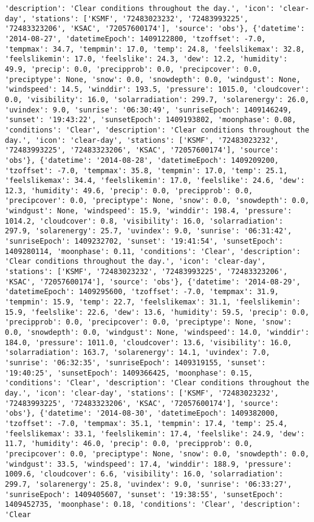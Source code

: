 \documentclass[
  letterpaper,
  DIV=11,
  numbers=noendperiod]{scrartcl}
\begin{document}
\begin{verbatim}
'description': 'Clear conditions throughout the day.', 'icon': 'clear-day', 'stations': ['KSMF', '72483023232', '72483993225', '72483323206', 'KSAC', '72057600174'], 'source': 'obs'}, {'datetime': '2014-08-27', 'datetimeEpoch': 1409122800, 'tzoffset': -7.0, 'tempmax': 34.7, 'tempmin': 17.0, 'temp': 24.8, 'feelslikemax': 32.8, 'feelslikemin': 17.0, 'feelslike': 24.3, 'dew': 12.2, 'humidity': 49.9, 'precip': 0.0, 'precipprob': 0.0, 'precipcover': 0.0, 'preciptype': None, 'snow': 0.0, 'snowdepth': 0.0, 'windgust': None, 'windspeed': 14.5, 'winddir': 193.5, 'pressure': 1015.0, 'cloudcover': 0.0, 'visibility': 16.0, 'solarradiation': 299.7, 'solarenergy': 26.0, 'uvindex': 9.0, 'sunrise': '06:30:49', 'sunriseEpoch': 1409146249, 'sunset': '19:43:22', 'sunsetEpoch': 1409193802, 'moonphase': 0.08, 'conditions': 'Clear', 'description': 'Clear conditions throughout the day.', 'icon': 'clear-day', 'stations': ['KSMF', '72483023232', '72483993225', '72483323206', 'KSAC', '72057600174'], 'source': 'obs'}, {'datetime': '2014-08-28', 'datetimeEpoch': 1409209200, 'tzoffset': -7.0, 'tempmax': 35.8, 'tempmin': 17.0, 'temp': 25.1, 'feelslikemax': 34.4, 'feelslikemin': 17.0, 'feelslike': 24.6, 'dew': 12.3, 'humidity': 49.6, 'precip': 0.0, 'precipprob': 0.0, 'precipcover': 0.0, 'preciptype': None, 'snow': 0.0, 'snowdepth': 0.0, 'windgust': None, 'windspeed': 15.9, 'winddir': 198.4, 'pressure': 1014.2, 'cloudcover': 0.8, 'visibility': 16.0, 'solarradiation': 297.9, 'solarenergy': 25.7, 'uvindex': 9.0, 'sunrise': '06:31:42', 'sunriseEpoch': 1409232702, 'sunset': '19:41:54', 'sunsetEpoch': 1409280114, 'moonphase': 0.11, 'conditions': 'Clear', 'description': 'Clear conditions throughout the day.', 'icon': 'clear-day', 'stations': ['KSMF', '72483023232', '72483993225', '72483323206', 'KSAC', '72057600174'], 'source': 'obs'}, {'datetime': '2014-08-29', 'datetimeEpoch': 1409295600, 'tzoffset': -7.0, 'tempmax': 31.9, 'tempmin': 15.9, 'temp': 22.7, 'feelslikemax': 31.1, 'feelslikemin': 15.9, 'feelslike': 22.6, 'dew': 13.6, 'humidity': 59.5, 'precip': 0.0, 'precipprob': 0.0, 'precipcover': 0.0, 'preciptype': None, 'snow': 0.0, 'snowdepth': 0.0, 'windgust': None, 'windspeed': 14.0, 'winddir': 184.0, 'pressure': 1011.0, 'cloudcover': 13.6, 'visibility': 16.0, 'solarradiation': 163.7, 'solarenergy': 14.1, 'uvindex': 7.0, 'sunrise': '06:32:35', 'sunriseEpoch': 1409319155, 'sunset': '19:40:25', 'sunsetEpoch': 1409366425, 'moonphase': 0.15, 'conditions': 'Clear', 'description': 'Clear conditions throughout the day.', 'icon': 'clear-day', 'stations': ['KSMF', '72483023232', '72483993225', '72483323206', 'KSAC', '72057600174'], 'source': 'obs'}, {'datetime': '2014-08-30', 'datetimeEpoch': 1409382000, 'tzoffset': -7.0, 'tempmax': 35.1, 'tempmin': 17.4, 'temp': 25.4, 'feelslikemax': 33.1, 'feelslikemin': 17.4, 'feelslike': 24.9, 'dew': 11.7, 'humidity': 46.0, 'precip': 0.0, 'precipprob': 0.0, 'precipcover': 0.0, 'preciptype': None, 'snow': 0.0, 'snowdepth': 0.0, 'windgust': 33.5, 'windspeed': 17.4, 'winddir': 188.9, 'pressure': 1009.6, 'cloudcover': 6.6, 'visibility': 16.0, 'solarradiation': 299.7, 'solarenergy': 25.8, 'uvindex': 9.0, 'sunrise': '06:33:27', 'sunriseEpoch': 1409405607, 'sunset': '19:38:55', 'sunsetEpoch': 1409452735, 'moonphase': 0.18, 'conditions': 'Clear', 'description': 'Clear 
\end{verbatim}
\end{document}
